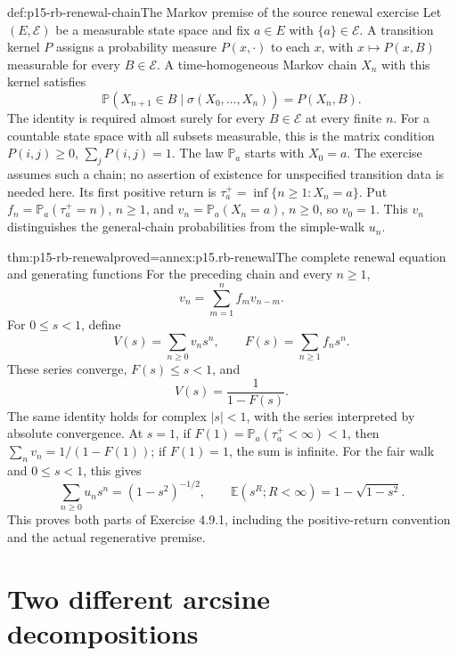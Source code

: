\begin{hbdefinition}{def:p15-rb-renewal-chain}{The Markov premise of the source renewal exercise}
Let \((E,\mathcal E)\) be a measurable state space and fix
\(a\in E\) with \(\{a\}\in\mathcal E\).
A transition kernel \(P\) assigns a
probability measure \(P(x,\cdot)\) to each \(x\), with
\(x\mapsto P(x,B)\) measurable for every \(B\in\mathcal E\).
A time-homogeneous Markov chain \(X_n\) with this kernel satisfies
\[
 \mathbb P(X_{n+1}\in B\mid\sigma(X_0,\ldots,X_n))=P(X_n,B).
\]
The identity is required almost surely for every
\(B\in\mathcal E\) at every finite \(n\).
For a countable state space with all subsets measurable, this is
the matrix condition \(P(i,j)\geq0\), \(\sum_jP(i,j)=1\).
The law \(\mathbb P_a\) starts with \(X_0=a\).
The exercise assumes such a chain; no assertion of existence
for unspecified transition data is needed here.
Its first positive return is
\(\tau_a^+=\inf\{n\geq1:X_n=a\}\).
Put \(f_n=\mathbb P_a(\tau_a^+=n)\), \(n\geq1\),
and \(v_n=\mathbb P_a(X_n=a)\), \(n\geq0\), so \(v_0=1\).
This \(v_n\) distinguishes the general-chain probabilities from
the simple-walk \(u_n\).
\end{hbdefinition}

\begin{hbtheorem}{thm:p15-rb-renewal}{proved=annex:p15.rb-renewal}{The complete renewal equation and generating functions}
For the preceding chain and every \(n\geq1\),
\[
 v_n=\sum_{m=1}^n f_m v_{n-m}.
 \]
For \(0\leq s<1\), define
\[
 V(s)=\sum_{n\geq0}v_ns^n,\qquad
 F(s)=\sum_{n\geq1}f_ns^n.
 \]
These series converge, \(F(s)\leq s<1\), and
\[
                         V(s)=\frac1{1-F(s)}.
 \]
The same identity holds for complex \(|s|<1\), with the
series interpreted by absolute convergence.
At \(s=1\), if \(F(1)=\mathbb P_a(\tau_a^+<\infty)<1\),
then \(\sum_nv_n=1/(1-F(1))\); if \(F(1)=1\), the sum is infinite.
For the fair walk and \(0\leq s<1\), this gives
\[
 \sum_{n\geq0}u_ns^n=(1-s^2)^{-1/2},\qquad
 \mathbb E(s^R;R<\infty)=1-\sqrt{1-s^2}.
 \]
This proves both parts of Exercise 4.9.1, including the
positive-return convention and the actual regenerative premise.
\end{hbtheorem}

\section{Two different arcsine decompositions}
\label{sec:p15-rb-arcsine}

